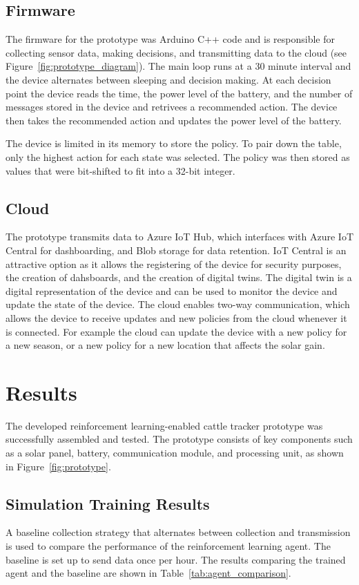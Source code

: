 \documentclass[10pt]{cai}
\begin{document}
\subsection{Firmware}
The firmware for the prototype was Arduino C++ code and is responsible for collecting sensor data, making decisions, and transmitting data to the cloud (see Figure~\ref{fig:prototype_diagram}).
The main loop runs at a 30 minute interval and the device alternates between sleeping and decision making.
At each decision point the device reads the time, the power level of the battery, and the number of messages stored in the device and retrivees a recommended action.
The device then takes the recommended action and updates the power level of the battery.

The device is limited in its memory to store the policy.
To pair down the table, only the highest action for each state was selected.
The policy was then stored as values that were bit-shifted to fit into a 32-bit integer.

\subsection{Cloud}
The prototype transmits data to Azure IoT Hub, which interfaces with Azure IoT Central for dashboarding, and Blob storage for data retention.
IoT Central is an attractive option as it allows the registering of the device for security purposes, the creation of dahsboards, and the creation of digital twins.
The digital twin is a digital representation of the device and can be used to monitor the device and update the state of the device.
The cloud enables two-way communication, which allows the device to receive updates and new policies from the cloud whenever it is connected.
For example the cloud can update the device with a new policy for a new season, or a new policy for a new location that affects the solar gain.


\section{Results}
The developed reinforcement learning-enabled cattle tracker prototype was successfully assembled and tested. 
The prototype consists of key components such as a solar panel, battery, communication module, and processing unit, as shown in Figure~\ref{fig:prototype}.

\subsection{Simulation Training Results}
A baseline collection strategy that alternates between collection and transmission is used to compare the performance of the reinforcement learning agent.
The baseline is set up to send data once per hour.
The results comparing the trained agent and the baseline are shown in Table~\ref{tab:agent_comparison}.
\end{document}
